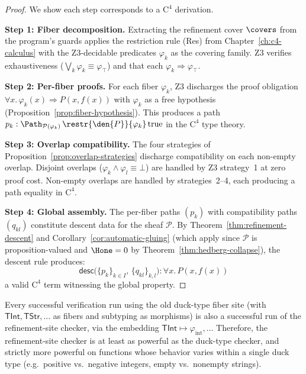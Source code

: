 \begin{proof}
We show each step corresponds to a $\mathrm{C}^4$ derivation.

\textbf{Step 1: Fiber decomposition.}
Extracting the refinement cover $\covers$ from the program's guards applies
the restriction rule \textsf{(Res)} from Chapter~\ref{ch:c4-calculus} with
the Z3-decidable predicates $\varphi_k$ as the covering family.  Z3 verifies
exhaustiveness ($\bigvee_k \varphi_k \equiv \varphi_\top$) and that each
$\varphi_k \Rightarrow \varphi_\top$.

\textbf{Step 2: Per-fiber proofs.}
For each fiber $\varphi_k$, Z3 discharges the proof obligation
$\forall x.\,\varphi_k(x) \Rightarrow P(x, f(x))$ with $\varphi_k$
as a free hypothesis (Proposition~\ref{prop:fiber-hypothesis}).  This
produces a path
$p_k : \Path_{\mathcal{P}(\varphi_k)}\,
\restr{\den{P}}{\varphi_k}\, \mathrm{true}$
in the $\mathrm{C}^4$ type theory.

\textbf{Step 3: Overlap compatibility.}
The four strategies of Proposition~\ref{prop:overlap-strategies}
discharge compatibility on each non-empty overlap.  Disjoint overlaps
($\varphi_k \wedge \varphi_l \equiv \bot$) are handled by Z3 strategy~1
at zero proof cost.  Non-empty overlaps are handled by strategies~2--4,
each producing a path equality in $\mathrm{C}^4$.

\textbf{Step 4: Global assembly.}
The per-fiber paths $(p_k)$ with compatibility paths $(q_{kl})$ constitute
descent data for the sheaf $\mathcal{P}$.  By Theorem~\ref{thm:refinement-descent}
and Corollary~\ref{cor:automatic-gluing} (which apply since $\mathcal{P}$
is proposition-valued and $\Hone = 0$ by Theorem~\ref{thm:hedberg-collapse}),
the descent rule produces:
\[
  \mathsf{desc}\bigl(\{p_k\}_{k \in I},\, \{q_{kl}\}_{k,l}\bigr) :
  \forall x.\, P(x, f(x))
\]
a valid $\mathrm{C}^4$ term witnessing the global property.
\end{proof}

\begin{corollary}
\label{cor:subsumption}
Every successful verification run using the old duck-type fiber site
(with $\mathsf{TInt}, \mathsf{TStr}, \ldots$ as fibers and subtyping
as morphisms) is also a successful run of the refinement-site checker,
via the embedding $\mathsf{TInt} \mapsto \varphi_{\mathrm{int}},\ldots$
Therefore, the refinement-site checker is at least as powerful as the
duck-type checker, and strictly more powerful on functions whose
behavior varies within a single duck type (e.g.\ positive vs.\ negative
integers, empty vs.\ nonempty strings).
\end{corollary}


